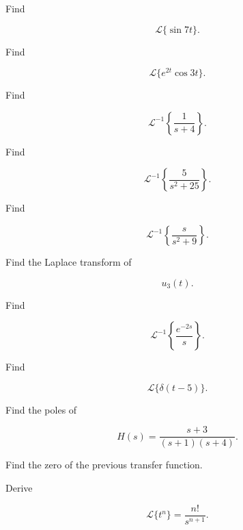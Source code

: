 \begin{exercise}[2]
Find

\[
\mathcal{L}\{\sin7t\}.
\]
\end{exercise}

\begin{exercise}[2]
Find

\[
\mathcal{L}\{e^{2t}\cos3t\}.
\]
\end{exercise}

\begin{exercise}[2]
Find

\[
\mathcal{L}^{-1}
\left\{
\frac1{s+4}
\right\}.
\]
\end{exercise}

\begin{exercise}[2]
Find

\[
\mathcal{L}^{-1}
\left\{
\frac5{s^2+25}
\right\}.
\]
\end{exercise}

\begin{exercise}[2]
Find

\[
\mathcal{L}^{-1}
\left\{
\frac{s}{s^2+9}
\right\}.
\]
\end{exercise}

\begin{exercise}[2]
Find the Laplace transform of

\[
u_3(t).
\]
\end{exercise}

\begin{exercise}[2]
Find

\[
\mathcal{L}^{-1}
\left\{
\frac{
e^{-2s}
}{
s
}
\right\}.
\]
\end{exercise}

\begin{exercise}[2]
Find

\[
\mathcal{L}
\{
\delta(t-5)
\}.
\]
\end{exercise}

\begin{exercise}[2]
Find the poles of

\[
H(s)
=
\frac{
s+3
}{
(s+1)(s+4)
}.
\]
\end{exercise}

\begin{exercise}[2]
Find the zero of the previous transfer function.
\end{exercise}

\begin{exercise}[3]
Derive

\[
\mathcal{L}\{t^n\}
=
\frac{n!}{s^{n+1}}.
\]
\end{exercise}

